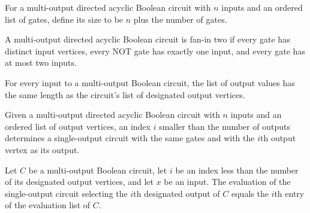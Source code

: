 \begin{definition}
\label{BoolCircuit.MultiDAGCircuit.size}
\leanok
For a multi-output directed acyclic Boolean circuit with $n$ inputs and an ordered list
of gates, define its size to be $n$ plus the number of gates.
\end{definition}

\begin{definition}
\label{BoolCircuit.MultiDAGCircuit.IsFaninTwo}
\leanok
A multi-output directed acyclic Boolean circuit is fan-in two if every gate has distinct
input vertices, every NOT gate has exactly one input, and every gate has at most two
inputs.
\end{definition}

\begin{theorem}
\label{BoolCircuit.MultiDAGCircuit.length_eval}
\leanok
{}
For every input to a multi-output Boolean circuit, the list of output values has the
same length as the circuit's list of designated output vertices.
\end{theorem}

\begin{definition}
\label{BoolCircuit.MultiDAGCircuit.outputCircuit}
\leanok
{}
Given a multi-output directed acyclic Boolean circuit with $n$ inputs and an ordered
list of output vertices, an index $i$ smaller than the number of outputs determines a
single-output circuit with the same gates and with the $i$th output vertex as its
output.
\end{definition}

\begin{theorem}
\label{BoolCircuit.MultiDAGCircuit.outputCircuit_eval}
\leanok
{}
Let $C$ be a multi-output Boolean circuit, let $i$ be an index less than the number of
its designated output vertices, and let $x$ be an input. The evaluation of the
single-output circuit selecting the $i$th designated output of $C$ equals the $i$th
entry of the evaluation list of $C$.
\end{theorem}

